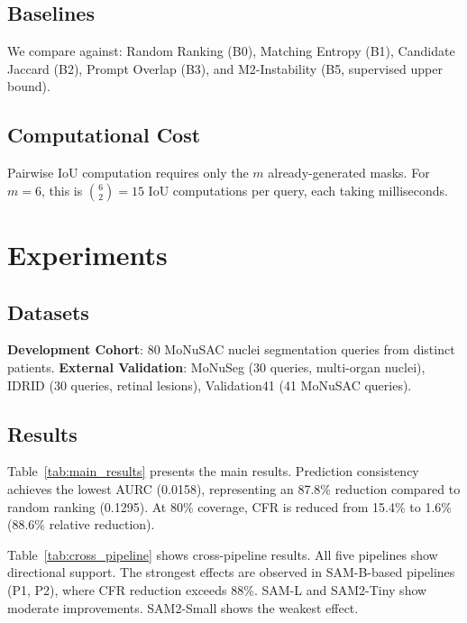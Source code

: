 \documentclass[11pt]{article}
\begin{document}
\subsection{Baselines}
We compare against: Random Ranking (B0), Matching Entropy (B1), Candidate Jaccard (B2), 
Prompt Overlap (B3), and M2-Instability (B5, supervised upper bound).

\subsection{Computational Cost}
Pairwise IoU computation requires only the $m$ already-generated masks. For $m=6$, 
this is $\binom{6}{2} = 15$ IoU computations per query, each taking milliseconds.

\section{Experiments}

\subsection{Datasets}
\textbf{Development Cohort}: 80 MoNuSAC nuclei segmentation queries from distinct patients. 
\textbf{External Validation}: MoNuSeg (30 queries, multi-organ nuclei), IDRID (30 queries, 
retinal lesions), Validation41 (41 MoNuSAC queries).

\subsection{Results}



Table~\ref{tab:main_results} presents the main results. Prediction consistency achieves 
the lowest AURC (0.0158), representing an 87.8\% reduction compared to random ranking 
(0.1295). At 80\% coverage, CFR is reduced from 15.4\% to 1.6\% (88.6\% relative reduction).



Table~\ref{tab:cross_pipeline} shows cross-pipeline results. All five pipelines show 
directional support. The strongest effects are observed in SAM-B-based pipelines (P1, P2), 
where CFR reduction exceeds 88\%. SAM-L and SAM2-Tiny show moderate improvements. 
SAM2-Small shows the weakest effect.


\end{document}
